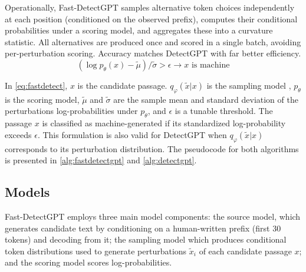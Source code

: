 \documentclass[11pt]{article}
\begin{document}
Operationally, Fast-DetectGPT samples alternative token choices independently at each position (conditioned on the observed prefix), computes their conditional probabilities under a scoring model, and aggregates these into a curvature statistic. All alternatives are produced once and scored in a single batch, avoiding per-perturbation scoring. Accuracy matches DetectGPT with far better efficiency.
\begin{equation}
  (\log p_\theta (x)-\tilde{\mu})/\tilde{\sigma} > \epsilon \rightarrow x \text{ is machine} 
  \label{eq:fastdetect}
\end{equation}

In \cref{eq:fastdetect}, $x$ is the candidate passage. $q_\varphi(\tilde{x}|x)$ is the sampling model , $p_\theta$ is the scoring model, $\tilde{\mu}$ and $\tilde{\sigma}$ are the sample mean and standard deviation of the perturbations log-probabilities under $p_\theta$, and $\epsilon$ is a tunable threshold. The passage $x$ is classified as machine-generated if its standardized log-probability exceeds $\epsilon$. This formulation is also valid for DetectGPT when $q_\varphi(\tilde{x}|x)$ corresponds to its perturbation distribution. The pseudocode for both algorithms is presented in \cref{alg:fastdetectgpt} and \cref{alg:detectgpt}.

\subsection{Models}

Fast-DetectGPT employs three main model components: the source model, which generates candidate text by conditioning on a human-written prefix (first 30 tokens) and decoding from it; the sampling model which produces conditional token distributions used to generate perturbations $\tilde{x}_i$ of each candidate passage $x$; and the scoring model scores log-probabilities.
\end{document}
